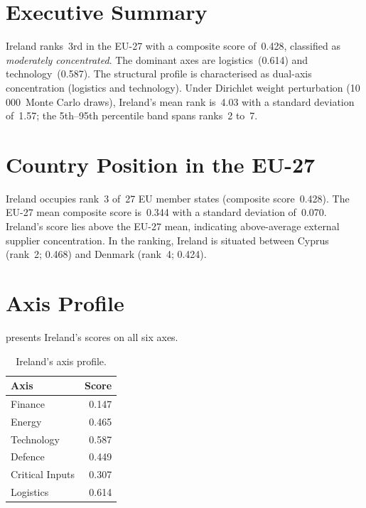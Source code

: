 \documentclass[12pt,a4paper]{article}
\begin{document}
\hypersetup{pageanchor=true}
\pagestyle{fancy}
\renewcommand{\headrulewidth}{0.4pt}


\section{Executive Summary}
\label{sec:summary}

Ireland ranks~3rd in the EU-27 with a composite \ISI score of~0.428, classified as \emph{moderately concentrated}.  The dominant axes are logistics~(0.614) and technology~(0.587).  The structural profile is characterised as dual-axis concentration (logistics and technology).  Under Dirichlet weight perturbation (10\,000~Monte Carlo draws), Ireland's mean rank is~4.03 with a standard deviation of~1.57; the 5th--95th percentile band spans ranks~2 to~7.


\section{Country Position in the EU-27}
\label{sec:position}

Ireland occupies rank~3 of~27 EU member states (composite score~0.428).  The EU-27 mean composite score is~0.344 with a standard deviation of~0.070.  Ireland's score lies above the EU-27 mean, indicating above-average external supplier concentration.  In the ranking, Ireland is situated between Cyprus (rank~2; 0.468) and Denmark (rank~4; 0.424).


\section{Axis Profile}
\label{sec:axis-profile}

 presents Ireland's scores on all six \ISI axes.

\begin{table}[htbp]
\centering\small
\caption{Ireland's \ISI axis profile.}
\label{tab:axis-profile}
\begin{tabular}{@{}lr@{}}
\toprule
\textbf{Axis} & \textbf{Score} \\
\midrule
    Finance           & 0.147 \\
    Energy            & 0.465 \\
    Technology        & 0.587 \\
    Defence           & 0.449 \\
    Critical Inputs   & 0.307 \\
    Logistics         & 0.614 \\
\bottomrule
\end{tabular}
\end{table}
\end{document}
